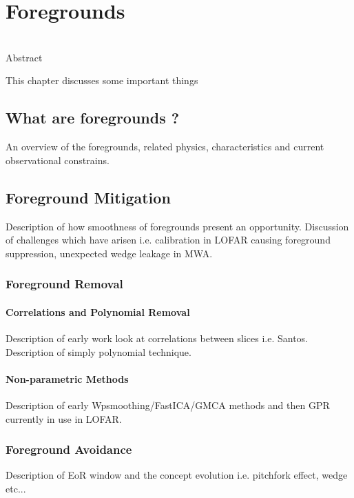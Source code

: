 \chapter{Foregrounds}

\begin{bf}
  \author{Emma Chapman and Vibor Jeli\'c}\\
  
Abstract\\
\end{bf}

This chapter discusses some important things


\section{What are foregrounds ?}
An overview of the foregrounds, related  physics, characteristics and current observational constrains.

\section{Foreground Mitigation}
Description of how smoothness of foregrounds present an opportunity. Discussion of challenges which have arisen
i.e. calibration in LOFAR causing foreground suppression, unexpected wedge leakage in MWA.

\subsection{Foreground Removal}

\subsubsection{Correlations and Polynomial Removal}
Description of early work look at correlations between slices i.e. Santos. Description of simply polynomial technique.

\subsubsection{Non-parametric Methods}
Description of early Wpsmoothing/FastICA/GMCA methods and then GPR currently in
use in LOFAR.

\subsection{Foreground Avoidance}
Description of EoR window and the concept evolution i.e. pitchfork
effect, wedge etc...

